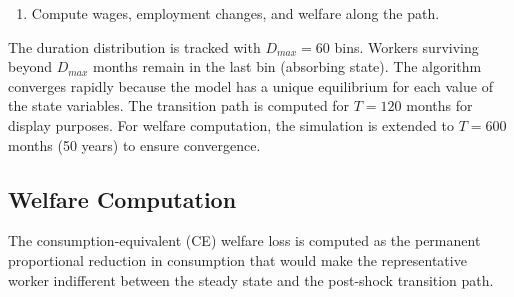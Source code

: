 \documentclass[12pt]{article}
\begin{document}
\begin{enumerate}
\begin{enumerate}
\begin{align*}
\end{align*}
\item Normalize: $(E_t, U_t, O_t) \leftarrow (E_t, U_t, O_t) / (E_t + U_t + O_t)$ and rescale $\{u_d'\}$ proportionally to match $U_t$.
\item Compute the scarred fraction exactly:
\begin{equation*}
s_t = \frac{\sum_{d \geq d^*} u_d}{U_t}.
\end{equation*}
This is the key improvement over v7: the scarred fraction is derived directly from the duration distribution rather than approximated by a reduced-form proxy.
\end{enumerate}
\item Compute wages, employment changes, and welfare along the path.
\end{enumerate}

The duration distribution is tracked with $D_{max} = 60$ bins. Workers surviving beyond $D_{max}$ months remain in the last bin (absorbing state). The algorithm converges rapidly because the model has a unique equilibrium for each value of the state variables. The transition path is computed for $T = 120$ months for display purposes. For welfare computation, the simulation is extended to $T = 600$ months (50 years) to ensure convergence.

\subsection{Welfare Computation}

The consumption-equivalent (CE) welfare loss is computed as the permanent proportional reduction in consumption that would make the representative worker indifferent between the steady state and the post-shock transition path.
\end{document}
